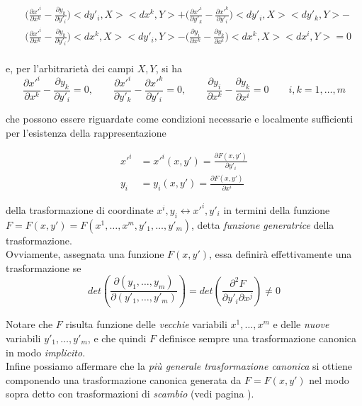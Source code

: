 \begin{equation*}
\begin{split}
&\biggl(\frac{\partial x'^i}{\partial x^k} - \frac{\partial y_k}{\partial y'_i}\biggr)<dy'_i, X><dx^k, Y> + \biggl(\frac{\partial x'^i}{\partial y'_k} - \frac{\partial x'^k}{\partial y'_i} \biggr)<dy'_i, X><dy'_k, Y> - \\
&\biggl( \frac{\partial x'^i}{\partial x^k} - \frac{\partial y_k}{\partial y'_i} \biggr)<dx^k, X><dy'_i, Y> - \biggl(\frac{\partial y_i}{\partial x^k} - \frac{\partial y_k}{\partial x^i} \biggr)<dx^k, X><dx^i, Y> = 0
\end{split}
\end{equation*}
\\
e, per l'arbitrarietà
dei campi $ X, Y $, si ha
\begin{equation*}
\frac{\partial x'^i}{\partial x^k}-\frac{\partial y_k}{\partial y'_i}=0, \qquad \frac{\partial x'^i}{\partial y'_k}-\frac{\partial x'^k}{\partial y'_i}=0, \qquad \frac{\partial y_i}{\partial x^k}-\frac{\partial y_k}{\partial x^i}=0 \qquad i, k = 1, \dots , m
\end{equation*}

che possono essere riguardate come condizioni necessarie e localmente sufficienti per l'esistenza della rappresentazione \label{pag:trasf_can_pag24}

\begin{align*}
x'^i &= x'^i(x,y')=\frac{\partial F(x,y')}{\partial y'_i}
\\
y_i &= y_i(x,y')=\frac{\partial F(x,y')}{\partial x^i}
\end{align*}

della trasformazione di coordinate $ x^i, y_i \longleftrightarrow x'^i, y'_i $ in termini della funzione $F = F (x, y') = F (x^1, \dots , x^m, y'_1, \dots , y'_m) $, detta \textit{funzione generatrice} della trasformazione.\\
Ovviamente, assegnata una funzione $ F (x, y') $, essa definirà effettivamente una trasformazione se
\begin{equation*}
det
\left( \frac{\partial (y_1, \dots , y_m)}{\partial (y'_1, \dots , y'_m)} \right) = det \left( \frac{\partial^2  F}{\partial y'_i \partial x^j} \right) \ne 0
\end{equation*}

Notare che $ F $ risulta funzione delle \textit{vecchie} variabili $ x^1, \dots ,x^m $ e delle \textit{nuove} variabili $ y'_1, \dots ,y'_m $, e che quindi $ F $ definisce sempre una trasformazione canonica in modo \textit{implicito}.\\
Infine possiamo affermare che la \textit{più generale trasformazione canonica} si ottiene componendo una trasformazione canonica generata da $ F = F (x, y') $ nel modo sopra detto con trasformazioni di \textit{scambio} (vedi pagina \pageref{pag:trasf_scambio} ).

